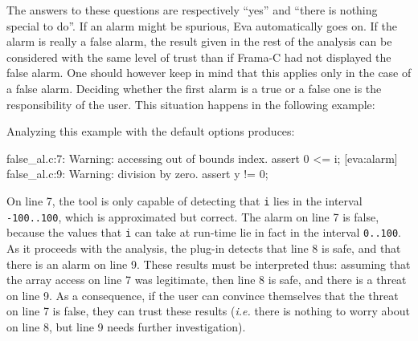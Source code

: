 \documentclass[web]{frama-c-book}
\newcommand{\Eva}{\textsf{Eva}}
\begin{document}
The answers to these questions are respectively ``yes'' and
``there is nothing special to do''. If an alarm might be spurious, \Eva{}
automatically goes on. If the alarm is really a
false alarm, the result given in the rest of the analysis can be
considered with the same level of trust than if Frama-C had not
displayed the false alarm. One should however keep in mind 
that this applies only in
the case of a false alarm. Deciding whether the first alarm is a true
or a false one is the responsibility of the user.
This situation 
happens in the following example:

Analyzing this example with the default options produces:
\begin{logs}
 false_al.c:7: Warning: accessing out of bounds index. assert 0 <= i;
[eva:alarm] false_al.c:9: Warning: division by zero. assert y != 0;
\end{logs}

On line 7, the tool is only capable of detecting that \lstinline|i| lies in
the interval \lstinline|-100..100|, which is approximated but correct.
The alarm on line 7 is false, because the values that \lstinline|i| can
take at run-time lie in fact in the interval \lstinline|0..100|. As it
proceeds with the analysis, the plug-in detects that line 8 is safe, and
that there is an alarm on line 9. These results must be interpreted 
thus: assuming that the array access on line 7 was legitimate, then
line 8 is safe, and there is a threat on line 9. As a consequence, if
the user can convince themselves that the threat on line 7 is false,
they can trust these results ({\it i.e.} there is nothing to worry
about on line 8, but line 9 needs further investigation).


\end{document}
